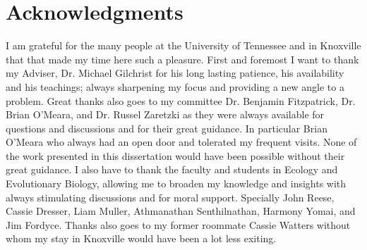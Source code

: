 \chapter*{Acknowledgments}
I am grateful for the many people at the University of Tennessee and in Knoxville that that made my time here such a pleasure.
First and foremost I want to thank my Adviser, Dr. Michael Gilchrist for his long lasting patience, his availability and his teachings;
always sharpening my focus and providing a new angle to a problem.
Great thanks also goes to my committee Dr. Benjamin Fitzpatrick, Dr. Brian O'Meara, and Dr. Russel Zaretzki as they were always available for questions and discussions and for their great guidance.
In particular Brian O'Meara who always had an open door and tolerated my frequent visits.
None of the work presented in this dissertation would have been possible without their great guidance.
I also have to thank the faculty and students in Ecology and Evolutionary Biology, allowing me to broaden my knowledge and insights with always stimulating discussions and for moral support.
Specially John Reese, Cassie Dresser, Liam Muller, Athmanathan Senthilnathan, Harmony Yomai, and Jim Fordyce.
Thanks also goes to my former roommate Cassie Watters without whom my stay in Knoxville would have been a lot less exiting.

